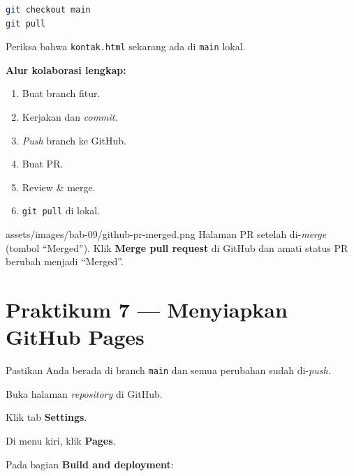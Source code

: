 \begin{lstlisting}[language=bash, caption={Ambil perubahan setelah merge PR}, label={lst:git-pull-merge}]
git checkout main
git pull
\end{lstlisting}

\begin{langkah}
  \item Periksa bahwa \texttt{kontak.html} sekarang ada di \texttt{main} lokal.
\end{langkah}

\begin{catatan}
\textbf{Alur kolaborasi lengkap:}
\begin{enumerate}
  \item Buat branch fitur.
  \item Kerjakan dan \emph{commit}.
  \item \emph{Push} branch ke GitHub.
  \item Buat PR.
  \item Review \& merge.
  \item \texttt{git pull} di lokal.
\end{enumerate}
\end{catatan}

\begin{tangkapanlayar}
  {assets/images/bab-09/github-pr-merged.png}
  {Halaman PR setelah di-\emph{merge} (tombol ``Merged'').}
  {Klik \textbf{Merge pull request} di GitHub dan amati status PR berubah menjadi ``Merged''.}
\end{tangkapanlayar}

\section{Praktikum 7 --- Menyiapkan GitHub Pages}
\label{sec:praktik-pages}

\begin{langkah}
  \item Pastikan Anda berada di branch \texttt{main} dan semua perubahan sudah di-\emph{push}.
  \item Buka halaman \emph{repository} di GitHub.
  \item Klik tab \textbf{Settings}.
  \item Di menu kiri, klik \textbf{Pages}.
  \item Pada bagian \textbf{Build and deployment}:
\end{langkah}

